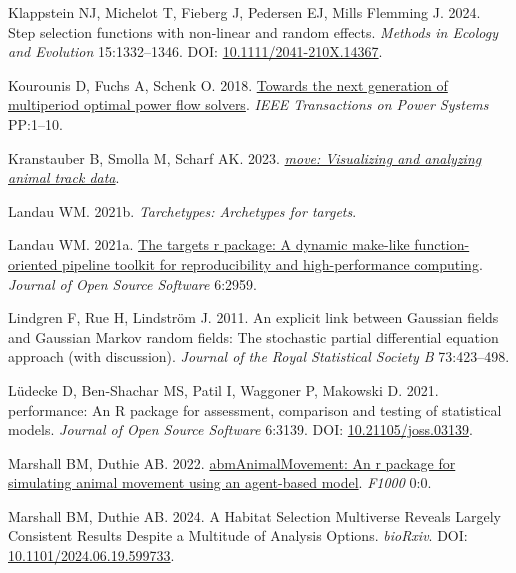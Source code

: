 \documentclass[10pt,a4paper]{article}
\newlength{\cslhangindent}
\newenvironment{CSLReferences}[2] %
 {\begin{list}{}{%
  \setlength{\itemindent}{0pt}
  \setlength{\leftmargin}{0pt}
  \setlength{\parsep}{0pt}
  \ifodd #1
   \setlength{\leftmargin}{\cslhangindent}
   \setlength{\itemindent}{-1\cslhangindent}
  \fi
  \setlength{\itemsep}{#2\baselineskip}}}
 {\end{list}}
\begin{document}
\begin{CSLReferences}{1}{0}
Klappstein NJ, Michelot T, Fieberg J, Pedersen EJ, Mills Flemming J. 2024. Step selection functions with non‐linear and random effects. \emph{Methods in Ecology and Evolution} 15:1332--1346. DOI: \href{https://doi.org/10.1111/2041-210X.14367}{10.1111/2041-210X.14367}.

Kourounis D, Fuchs A, Schenk O. 2018. \href{https://doi.org/10.1109/TPWRS.2017.2789187}{Towards the next generation of multiperiod optimal power flow solvers}. \emph{IEEE Transactions on Power Systems} PP:1--10.

Kranstauber B, Smolla M, Scharf AK. 2023. \emph{\href{https://CRAN.R-project.org/package=move}{{move}: Visualizing and analyzing animal track data}}.

Landau WM. 2021b. \emph{Tarchetypes: Archetypes for targets}.

Landau WM. 2021a. \href{https://doi.org/10.21105/joss.02959}{The targets r package: A dynamic make-like function-oriented pipeline toolkit for reproducibility and high-performance computing}. \emph{Journal of Open Source Software} 6:2959.

Lindgren F, Rue H, Lindström J. 2011. An explicit link between {Gaussian} fields and {Gaussian} {Markov} random fields: The stochastic partial differential equation approach (with discussion). \emph{Journal of the Royal Statistical Society B} 73:423--498.

Lüdecke D, Ben-Shachar MS, Patil I, Waggoner P, Makowski D. 2021. {performance}: An {R} package for assessment, comparison and testing of statistical models. \emph{Journal of Open Source Software} 6:3139. DOI: \href{https://doi.org/10.21105/joss.03139}{10.21105/joss.03139}.

Marshall BM, Duthie AB. 2022. \href{https://0}{{abmAnimalMovement}: An r package for simulating animal movement using an agent-based model}. \emph{F1000} 0:0.

Marshall BM, Duthie AB. 2024. A {Habitat} {Selection} {Multiverse} {Reveals} {Largely} {Consistent} {Results} {Despite} a {Multitude} of {Analysis} {Options}. \emph{bioRxiv}. DOI: \href{https://doi.org/10.1101/2024.06.19.599733}{10.1101/2024.06.19.599733}.


\end{CSLReferences}
\end{document}
